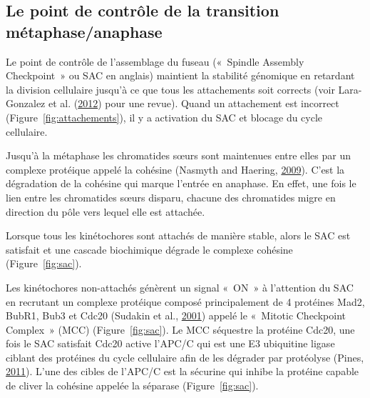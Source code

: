 \documentclass[12pt,a4paper,twoside,openright]{book}
\begin{document}
\subsection{Le point de contrôle de la transition
métaphase/anaphase}\label{le-point-de-contruxf4le-de-la-transition-muxe9taphaseanaphase}

\label{sec:sac}

Le point de contrôle de l'assemblage du fuseau («~Spindle Assembly
Checkpoint~» ou SAC en anglais) maintient la stabilité génomique en
retardant la division cellulaire jusqu'à ce que tous les attachements
soit corrects (voir Lara-Gonzalez et al.
(\protect\hyperlink{ref-Lara-Gonzalez2012}{2012}) pour une revue). Quand
un attachement est incorrect (Figure~\ref{fig:attachements}), il y a
activation du SAC et blocage du cycle cellulaire.

Jusqu'à la métaphase les chromatides sœurs sont maintenues entre elles
par un complexe protéique appelé la cohésine (Nasmyth and Haering,
\protect\hyperlink{ref-Nasmyth2009}{2009}). C'est la dégradation de la
cohésine qui marque l'entrée en anaphase. En effet, une fois le lien
entre les chromatides sœurs disparu, chacune des chromatides migre en
direction du pôle vers lequel elle est attachée.

Lorsque tous les kinétochores sont attachés de manière stable, alors le
SAC est satisfait et une cascade biochimique dégrade le complexe
cohésine (Figure~\ref{fig:sac}).

Les kinétochores non-attachés génèrent un signal «~ON~» à l'attention du
SAC en recrutant un complexe protéique composé principalement de 4
protéines Mad2, BubR1, Bub3 et Cdc20 (Sudakin et al.,
\protect\hyperlink{ref-Sudakin2001}{2001}) appelé le «~Mitotic
Checkpoint Complex~» (MCC) (Figure~\ref{fig:sac}). Le MCC séquestre la
protéine Cdc20, une fois le SAC satisfait Cdc20 active l'APC/C qui est
une E3 ubiquitine ligase ciblant des protéines du cycle cellulaire afin
de les dégrader par protéolyse (Pines,
\protect\hyperlink{ref-Pines2011}{2011}). L'une des cibles de l'APC/C
est la sécurine qui inhibe la protéine capable de cliver la cohésine
appelée la séparase (Figure~\ref{fig:sac}).
\end{document}

